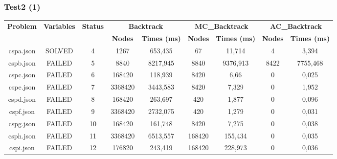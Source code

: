 \documentclass{beamer}
\begin{document}
\begin{frame}[fragile]
\frametitle{Test2 (1)}
\begin{tiny}
\begin{tabular}{c | c | c | c c | c c | c c}
\textbf{Problem} & \textbf{Variables} & \textbf{Status} & \multicolumn{2}{c}{\textbf{Backtrack}} & \multicolumn{2}{c}{\textbf{MC\_Backtrack}} & \multicolumn{2}{c}{\textbf{AC\_Backtrack}} \\
 & & & \textbf{Nodes} & \textbf{Times (ms)} & \textbf{Nodes} & \textbf{Times (ms)} & \textbf{Nodes} & \textbf{Times (ms)}\\
\toprule
cspa.json & SOLVED & 4 & 1267 & 653,435 & 67 & 11,714 & 4 & 3,394 \\
\midrule
cspb.json & FAILED & 5 & 8840 & 8217,945 & 8840 & 9376,913 & 8422 & 7755,468 \\
\midrule
cspc.json & FAILED & 6 & 168420 & 118,939 & 8420 & 6,66 & 0 & 0,025 \\
\midrule
cspe.json & FAILED & 7 & 3368420	& 3443,583 & 8420 & 7,329 & 0 & 1,952 \\
\midrule
cspd.json & FAILED & 8 & 168420 & 263,697 & 420 & 1,877 & 0 & 0,096 \\
\midrule
cspf.json & FAILED & 9 & 3368420	& 2732,075 & 420 & 1,279 & 0 & 0,031 \\
\midrule
cspg.json & FAILED & 10 & 168420	& 161,748 & 8420 & 7,275 & 0 & 0,038 \\
\midrule
csph.json & FAILED & 11 & 3368420 & 6513,557 & 168420 & 155,434 & 0 & 0,035 \\
\midrule
cspi.json & FAILED & 12 & 176820	& 243,419 & 168420 & 228,973 & 0 & 0,036 \\
\bottomrule
\end{tabular}
\end{tiny}
\end{frame}
\end{document}
